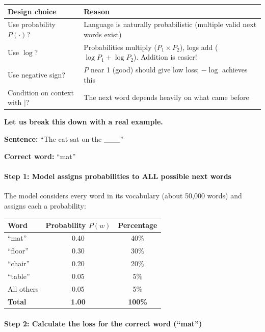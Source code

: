 \begin{chapterenv}
\begin{infobox}
\begin{center}
\begin{tabular}{p{}p{}}
\toprule
\textbf{Design choice} & \textbf{Reason} \\
\midrule
Use probability $P(\cdot)$? & Language is naturally probabilistic (multiple valid next words exist) \\
Use $\log$? & Probabilities multiply ($P_1 \times P_2$), logs add ($\log P_1 + \log P_2$). Addition is easier! \\
Use negative sign? & $P$ near 1 (good) should give low loss; $-\log$ achieves this \\
Condition on context with $|$? & The next word depends heavily on what came before \\
\bottomrule
\end{tabular}
\end{center}
\end{infobox}

\textbf{Let us break this down with a real example.}

\textbf{Sentence:} ``The cat sat on the \_\_\_''

\textbf{Correct word:} ``mat''

\paragraph{Step 1: Model assigns probabilities to ALL possible next words}

The model considers every word in its vocabulary (about 50,000 words) and assigns each a probability:

\begin{center}
\begin{tabular}{lcc}
\toprule
\textbf{Word} & \textbf{Probability $P(w)$} & \textbf{Percentage} \\
\midrule
``mat'' & 0.40 & 40\% \\
``floor'' & 0.30 & 30\% \\
``chair'' & 0.20 & 20\% \\
``table'' & 0.05 & 5\% \\
All others & 0.05 & 5\% \\
\midrule
\textbf{Total} & \textbf{1.00} & \textbf{100\%} \\
\bottomrule
\end{tabular}
\end{center}

\paragraph{Step 2: Calculate the loss for the correct word (``mat'')}


\end{chapterenv}
